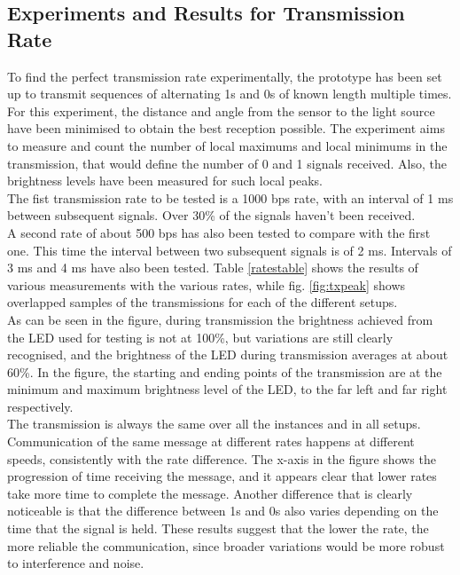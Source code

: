 \subsection{Experiments and Results for Transmission Rate}
\label{tr:rate:exp}

To find the perfect transmission rate experimentally, the prototype has been set up to transmit sequences of alternating 1s and 0s of known length multiple times.
For this experiment, the distance and angle from the sensor to the light source have been minimised to obtain the best reception possible.
The experiment aims to measure and count the number of local maximums and local minimums in the transmission, that would define the number of 0 and 1 signals received.
Also, the brightness levels have been measured for such local peaks.\\
The fist transmission rate to be tested is a 1000 bps rate, with an interval of 1 ms between subsequent signals.
Over 30\% of the signals haven't been received.\\
A second rate of about 500 bps has also been tested to compare with the first one.
This time the interval between two subsequent signals is of 2 ms.
Intervals of 3 ms and 4 ms have also been tested.
Table \ref{ratestable} shows the results of various measurements with the various rates, while fig. \ref{fig:txpeak} shows overlapped samples of the transmissions for each of the different setups.\\
As can be seen in the figure, during transmission the brightness achieved from the LED used for testing is not at 100\%, but variations are still clearly recognised, and the brightness of the LED during transmission averages at about 60\%. 
In the figure, the starting and ending points of the transmission are at the minimum and maximum brightness level of the LED, to the far left and far right respectively.\\
The transmission is always the same over all the instances and in all setups.
Communication of the same message at different rates happens at different speeds, consistently with the rate difference.
The x-axis in the figure shows the progression of time receiving the message, and it appears clear that lower rates take more time to complete the message.
Another difference that is clearly noticeable is that the difference between 1s and 0s also varies depending on the time that the signal is held.
These results suggest that the lower the rate, the more reliable the communication, since broader variations would be more robust to interference and noise.
